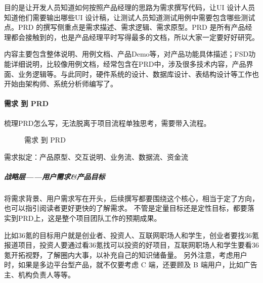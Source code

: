 \documentclass[letterpaper,11pt,english]{sphinxmanual}
\begin{document}
目的是让开发人员知道如何按照产品经理的思路为需求撰写代码，让UI
设计人员知道他们需要输出哪些UI
设计稿，让测试人员知道测试用例中需要包含哪些测试点。PRD
的撰写侧重点是需求描述、需求逻辑、需求原型。PRD
是所有产品经理都会接触到的，也是产品经理平时写得最多的文档，所以大家一定要好好研究。

内容主要包含整体说明、用例文档、产品Demo等，对产品功能具体描述；FSD功能详细说明，比较像用例文档，经常包含在PRD中，涉及很多技术内容，产品界面、业务逻辑等。与此同时，硬件系统的设计、数据库设计、表结构设计等工作也开始由架构师、系统分析师编写了。
%
\begin{footnote}[489]\sphinxAtStartFootnote
{}
%
\end{footnote}


\paragraph{需求 到 PRD}
\label{\detokenize{chapter_knowledge/PRD:id2}}
梳理PRD怎么写，无法脱离于项目流程单独思考，需要带入流程。

\begin{figure}[H]
\centering
\capstart

\noindent{}
\caption{需求 到 PRD
\sphinxfootnotemark[490]}\label{\detokenize{chapter_knowledge/PRD:id31}}\end{figure}
%
\begin{footnotetext}[490]\sphinxAtStartFootnote
{}
%
\end{footnotetext}\ignorespaces 
需求拟定：产品原型、交互说明、业务流、数据流、资金流


\subparagraph{战略层——用户需求\&产品目标}
\label{\detokenize{chapter_knowledge/PRD:id3}}
将需求背景、用户需求写在开头，后续撰写都要围绕这个核心，相当于定了方向，也可以指引阅读者更好更快的了解需求。
不管是定量目标还是定性目标，都要落实到PRD上，这是整个项目团队工作的预期成果。

比如36氪的目标用户就是创业者、投资人、互联网职场人和学生，创业者要找36氪报道项目，投资人要通过看36氪找可以投资的好项目，互联网职场人和学生要看36氪开拓视野，了解圈内大事，以补充自己的知识储备量。
另外注意，考虑用户时，如果是多边平台型产品，就不仅要考虑 C 端，还要顾及
B 端用户，比如广告主、机构负责人等等。
\end{document}
